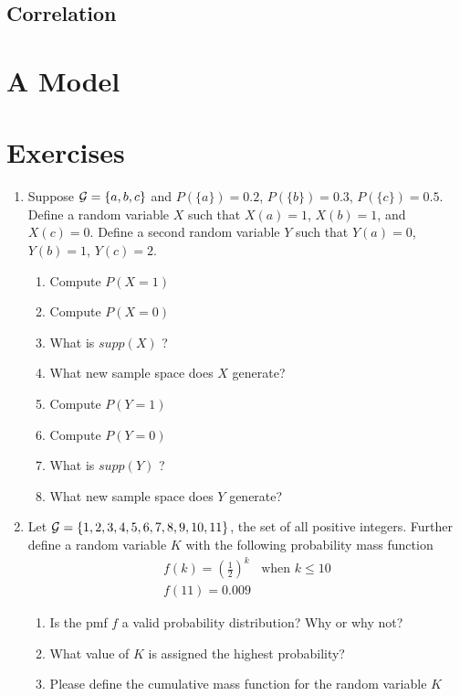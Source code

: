 \subsection{Correlation}


\section{A Model}




\section{Exercises}

\begin{enumerate}
    \item Suppose $\mathcal{G} = \{ a,b,c \}$ and $P(\{a\})=0.2$, $P(\{b\})=0.3$, $P(\{c\})=0.5$. Define a random variable $X$ such that $X(a)=1$, $X(b)=1$, and $X(c)=0$.
    Define a second random variable $Y$ such that $Y(a)=0$, $Y(b) = 1$, $Y(c)=2$.
    \begin{enumerate}
        \item Compute $P(X=1)$
        \item Compute $P(X=0)$
        \item What is $supp(X)$ ? 
        \item What new sample space does $X$ generate?
        \item Compute $P(Y=1)$
        \item Compute $P(Y=0)$
        \item What is $supp(Y)$ ? 
        \item What new sample space does $Y$ generate?
    \end{enumerate}
    \item Let $\mathcal{G} = \{1,2,3,4,5,6,7,8,9,10,11\}$, the set of all positive integers. Further define a random variable $K$ with the following probability mass function 
    \begin{align*}
        f(k) = \left( \frac{1}{2} \right) ^{k} & \text{when } k \leq 10\\
        f(11) = 0.009
    \end{align*} 
    \begin{enumerate}
        \item Is the pmf $f$ a valid probability distribution? Why or why not?
        \item What value of $K$ is assigned the highest probability? 
        \item Please define the cumulative mass function for the random variable $K$
    \end{enumerate}
    

\end{enumerate}
